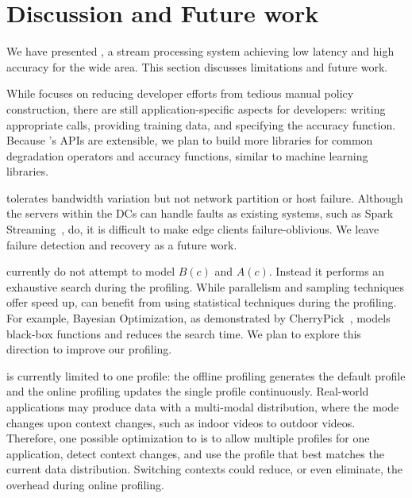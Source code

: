\section{Discussion and Future work}
\label{sec:discussion}

We have presented \sysname{}, a stream processing system achieving low latency
and high accuracy for the wide area. This section discusses limitations and
future work.

 While \sysname{} focuses on reducing
developer efforts from tedious manual policy construction, there are still
application-specific aspects for developers: writing appropriate \maybe{} calls,
providing training data, and specifying the accuracy function. Because
\sysname{}'s APIs are extensible, we plan to build more libraries for common
degradation operators and accuracy functions, similar to machine learning
libraries.

 \sysname{} tolerates bandwidth
variation but not network partition or host failure. Although the servers within
the DCs can handle faults as existing systems, such as Spark
Streaming~\cite{zaharia2013discretized}, do, it is difficult to make edge
clients failure-oblivious.  We leave failure detection and recovery as a future
work.

 \sysname{} currently do not attempt to model $B(c)$
and $A(c)$. Instead it performs an exhaustive search during the profiling. While
parallelism and sampling techniques offer speed up, \sysname{} can benefit from
using statistical techniques during the profiling. For example, Bayesian
Optimization, as demonstrated by CherryPick~\cite{alipourfard2017cherrypick},
models black-box functions and reduces the search time. We plan to explore this
direction to improve our profiling.


 \sysname{} is currently limited to one profile: the
offline profiling generates the default profile and the online profiling updates
the single profile continuously.  Real-world applications may produce data with
a multi-modal distribution, where the mode changes upon context changes, such as
indoor videos to outdoor videos. Therefore, one possible optimization to
\sysname{} is to allow multiple profiles for one application, detect context
changes, and use the profile that best matches the current data distribution.
Switching contexts could reduce, or even eliminate, the overhead during online
profiling.

